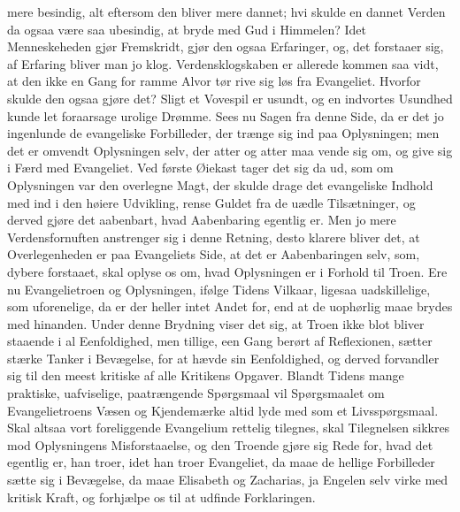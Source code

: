 \documentclass[12pt,a4paper]{book}
\begin{document}
mere besindig, alt eftersom den bliver mere dannet; hvi skulde en
dannet Verden da ogsaa være saa ubesindig, at bryde med Gud i
Himmelen? Idet Menneskeheden gjør Fremskridt, gjør den ogsaa
Erfaringer, og, det forstaaer sig, af Erfaring bliver man jo klog.
Verdensklogskaben er allerede kommen saa vidt, at den ikke en Gang for
ramme Alvor tør rive sig løs fra Evangeliet. Hvorfor skulde den ogsaa
gjøre det? Sligt et Vovespil er usundt, og en indvortes Usundhed kunde
let foraarsage urolige Drømme. Sees nu Sagen fra denne Side, da er det
jo ingenlunde de evangeliske Forbilleder, der trænge sig ind paa
Oplysningen; men det er omvendt Oplysningen selv, der atter og atter
maa vende sig om, og give sig i Færd med Evangeliet. Ved første Øiekast
tager det sig da ud, som om Oplysningen var den overlegne Magt, der
skulde drage det evangeliske Indhold med ind i den høiere Udvikling,
rense Guldet fra de uædle Tilsætninger, og derved gjøre det aabenbart,
hvad Aabenbaring egentlig er. Men jo mere Verdensfornuften anstrenger
sig i denne Retning, desto klarere bliver det, at Overlegenheden er paa
Evangeliets Side, at det er Aabenbaringen selv, som, dybere forstaaet,
skal oplyse os om, hvad Oplysningen er i Forhold til Troen. Ere nu
Evangelietroen og Oplysningen, ifølge Tidens Vilkaar, ligesaa
uadskillelige, som uforenelige, da er der heller intet Andet for, end
at de uophørlig maae brydes med hinanden. Under denne Brydning viser
det sig, at Troen ikke blot bliver staaende i al Eenfoldighed,
men tillige, een Gang berørt af Reflexionen, sætter stærke Tanker i
Bevægelse, for at hævde sin Eenfoldighed, og derved forvandler sig til
den meest kritiske af alle Kritikens Opgaver. Blandt Tidens mange
praktiske, uafviselige, paatrængende Spørgsmaal vil Spørgsmaalet om
Evangelietroens Væsen og Kjendemærke altid lyde med som et
Livsspørgsmaal. Skal altsaa vort foreliggende Evangelium rettelig
tilegnes, skal Tilegnelsen sikkres mod Oplysningens Misforstaaelse, og
den Troende gjøre sig Rede for, hvad det egentlig er, han troer, idet
han troer Evangeliet, da maae de hellige Forbilleder sætte sig i
Bevægelse, da maae Elisabeth og Zacharias, ja Engelen selv virke med
kritisk Kraft, og forhjælpe os til at udfinde Forklaringen.
\end{document}
